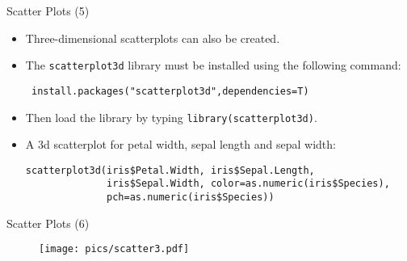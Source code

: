\documentclass[handout]{beamer}
\begin{document}
\begin{frame}[fragile]{Scatter Plots (5)}
\scriptsize{
\begin{itemize}
 \item Three-dimensional scatterplots can also be created.
 \item The \verb+scatterplot3d+ library must be installed using the following command:
 
 \begin{verbatim}
 install.packages("scatterplot3d",dependencies=T)
 \end{verbatim}
 
 \item Then load the library by typing \verb+library(scatterplot3d)+.
 
 \item A 3d scatterplot for petal width, sepal length and sepal width:
 \begin{verbatim}
scatterplot3d(iris$Petal.Width, iris$Sepal.Length, 
              iris$Sepal.Width, color=as.numeric(iris$Species),
              pch=as.numeric(iris$Species))  
 \end{verbatim}

 
  
\end{itemize}




}
 
\end{frame}


\begin{frame}[fragile]{Scatter Plots (6)}

 
 
  \begin{figure}[h!]
	\centering
	\texttt{[image: pics/scatter3.pdf]}		
\end{figure} 
 
 

 
\end{frame}
\end{document}
